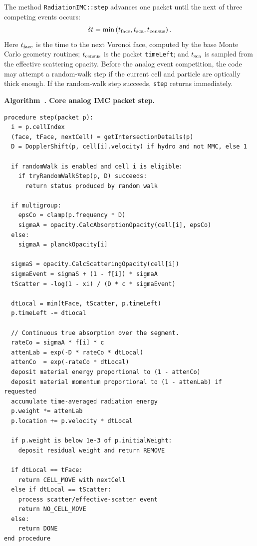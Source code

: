 \documentclass[11pt]{article}
\newcounter{algorithm}
\newcommand{\AlgorithmCaption}[2]{%
  \refstepcounter{algorithm}%
  \label{#1}%
  \par\medskip\noindent\textbf{Algorithm~\thealgorithm. #2}\par\nobreak\smallskip%
}
\begin{document}
The method \texttt{RadiationIMC::step} advances one packet until the next of
three competing events occurs:
\begin{equation}
  \delta t
  =
  \min
  \left(
    t_{\rm face},
    t_{\rm sca},
    t_{\rm census}
  \right).
  \label{eq:event-min}
\end{equation}
Here \(t_{\rm face}\) is the time to the next Voronoi face, computed by the
base Monte Carlo geometry routines; \(t_{\rm census}\) is the packet
\texttt{timeLeft}; and \(t_{\rm sca}\) is sampled from the effective scattering
opacity. Before the analog event competition, the code may attempt a
random-walk step if the current cell and particle are optically thick enough.
If the random-walk step succeeds, \texttt{step} returns immediately.

\AlgorithmCaption{alg:packet-step}{Core analog IMC packet step.}
\begin{verbatim}
procedure step(packet p):
  i = p.cellIndex
  (face, tFace, nextCell) = getIntersectionDetails(p)
  D = DopplerShift(p, cell[i].velocity) if hydro and not MMC, else 1

  if randomWalk is enabled and cell i is eligible:
    if tryRandomWalkStep(p, D) succeeds:
      return status produced by random walk

  if multigroup:
    epsCo = clamp(p.frequency * D)
    sigmaA = opacity.CalcAbsorptionOpacity(cell[i], epsCo)
  else:
    sigmaA = planckOpacity[i]

  sigmaS = opacity.CalcScatteringOpacity(cell[i])
  sigmaEvent = sigmaS + (1 - f[i]) * sigmaA
  tScatter = -log(1 - xi) / (D * c * sigmaEvent)

  dtLocal = min(tFace, tScatter, p.timeLeft)
  p.timeLeft -= dtLocal

  // Continuous true absorption over the segment.
  rateCo = sigmaA * f[i] * c
  attenLab = exp(-D * rateCo * dtLocal)
  attenCo  = exp(-rateCo * dtLocal)
  deposit material energy proportional to (1 - attenCo)
  deposit material momentum proportional to (1 - attenLab) if requested
  accumulate time-averaged radiation energy
  p.weight *= attenLab
  p.location += p.velocity * dtLocal

  if p.weight is below 1e-3 of p.initialWeight:
    deposit residual weight and return REMOVE

  if dtLocal == tFace:
    return CELL_MOVE with nextCell
  else if dtLocal == tScatter:
    process scatter/effective-scatter event
    return NO_CELL_MOVE
  else:
    return DONE
end procedure
\end{verbatim}
\end{document}
